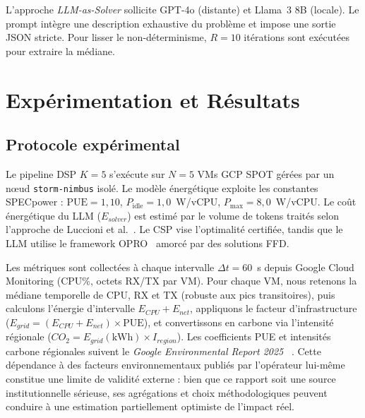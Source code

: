 ﻿\documentclass[systeme]{compas2026}
\begin{document}
L'approche \emph{LLM-as-Solver} sollicite GPT-4o (distante) et Llama~3 8B (locale). Le prompt intègre une description exhaustive du problème et impose une sortie JSON stricte. Pour lisser le non-déterminisme, $R = 10$ itérations sont exécutées pour extraire la médiane.

\section{Expérimentation et Résultats}
\label{sec:setup_results}

\subsection{Protocole expérimental}
Le pipeline DSP $K{=}5$ s'exécute sur $N{=}5$ VMs GCP SPOT gérées par un nœud \texttt{storm-nimbus} isolé. Le modèle énergétique exploite les constantes SPECpower : $\text{PUE}{=}1{,}10$, $P_{\text{idle}}{=}1{,}0$~W/vCPU, $P_{\text{max}}{=}8{,}0$~W/vCPU. Le coût énergétique du LLM ($E_{solver}$) est estimé par le volume de tokens traités selon l'approche de Luccioni et al.~\cite{luccioni2023power}. Le CSP vise l'optimalité certifiée, tandis que le LLM utilise le framework OPRO~\cite{yang2024large} amorcé par des solutions FFD. 

Les métriques sont collectées à chaque intervalle $\Delta t{=}60$~s depuis Google Cloud Monitoring (CPU\%, octets RX/TX par VM). Pour chaque VM, nous retenons la médiane temporelle de CPU, RX et TX (robuste aux pics transitoires), puis calculons l'énergie d'intervalle $E_{CPU}{+}E_{net}$, appliquons le facteur d'infrastructure ($E_{grid}{=}(E_{CPU}{+}E_{net})\times\text{PUE}$), et convertissons en carbone via l'intensité régionale ($CO_2{=}E_{grid}(\text{kWh})\times I_{region}$). Les coefficients PUE et intensités carbone régionales suivent le \emph{Google Environmental Report 2025} ~\cite{google2025environmentalreport}. Cette dépendance à des facteurs environnementaux publiés par l'opérateur lui-même constitue une limite de validité externe : bien que ce rapport soit une source institutionnelle sérieuse, ses agrégations et choix méthodologiques peuvent conduire à une estimation partiellement optimiste de l'impact réel.
\end{document}
